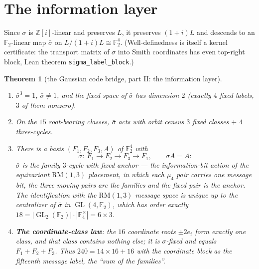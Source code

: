 \documentclass[11pt,a4paper]{article}
\newtheorem{theorem}{Theorem}
\theoremstyle{remark}
\newcommand{\F}{\mathbb F}
\newcommand{\Z}{\mathbb Z}
\DeclareMathOperator{\GL}{GL}
\begin{document}
\section{The information layer}\label{sec:info}

Since $\sigma$ is $\Z[i]$-linear and preserves $L$, it preserves
$(1+i)L$ and descends to an $\F_2$-linear map $\bar\sigma$ on
$L/(1+i)L\cong\F_2^4$.  (Well-definedness is itself a kernel
certificate: the transport matrix of $\sigma$ into Smith coordinates
has even top-right block, Lean theorem \texttt{sigma\_label\_block}.)

\begin{theorem}[the Gaussian code bridge, part II: the information
layer]\label{thm:info}
\begin{enumerate}
\item[(i)] $\bar\sigma^3=1$, $\bar\sigma\neq1$, and the fixed space
of $\bar\sigma$ has dimension $2$ (exactly $4$ fixed labels, $3$ of
them nonzero).
\item[(ii)] On the $15$ root-bearing classes, $\bar\sigma$ acts with
orbit census $3$ fixed classes $+$ $4$ three-cycles.
\item[(iii)] There is a basis $(F_1,F_2,F_3,A)$ of $\F_2^4$ with
\[
\bar\sigma:\ F_1\to F_2\to F_3\to F_1,\qquad \bar\sigma A=A :
\]
$\bar\sigma$ is the \emph{family $3$-cycle with fixed anchor} --- the
information-bit action of the equivariant $\mathrm{RM}(1,3)$
placement, in which each $\mu_4$ pair carries one message bit, the
three moving pairs are the families and the fixed pair is the anchor.
The identification with the $\mathrm{RM}(1,3)$ message space is
unique up to the centralizer of $\bar\sigma$ in $\GL(4,\F_2)$, which
has order exactly $18=|\GL_2(\F_2)|\cdot|\F_4^\times|=6\times3$.
\item[(iv)] \textbf{The coordinate-class law}: the $16$ coordinate
roots $\pm2e_i$ form exactly one class, and that class contains
nothing else; it is $\sigma$-fixed and equals $F_1+F_2+F_3$.  Thus
$240=14\times16+16$ with the coordinate block as the fifteenth
message label, the ``sum of the families''.
\end{enumerate}
\end{theorem}
\end{document}
